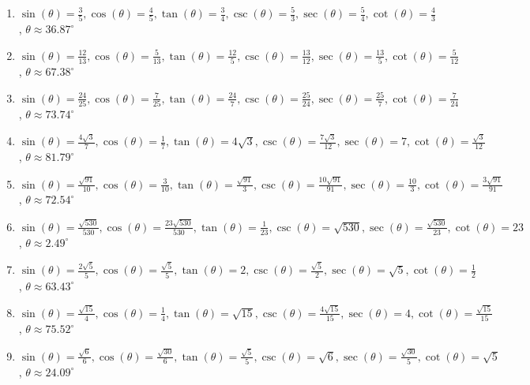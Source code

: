 \documentclass{ximera}
\begin{document}
\begin{enumerate}

\setcounter{enumi}{\value{HW}}

\item $\sin(\theta) = \frac{3}{5}, \cos(\theta) = \frac{4}{5}, \tan(\theta) = \frac{3}{4}, \csc(\theta) = \frac{5}{3}, \sec(\theta) = \frac{5}{4}, \cot(\theta) = \frac{4}{3}$, $\theta \approx 36.87^{\circ}$

\item $\sin(\theta) = \frac{12}{13}, \cos(\theta) = \frac{5}{13}, \tan(\theta) = \frac{12}{5}, \csc(\theta) = \frac{13}{12}, \sec(\theta) = \frac{13}{5}, \cot(\theta) = \frac{5}{12}$, $\theta \approx 67.38^{\circ}$

\item $\sin(\theta) = \frac{24}{25}, \cos(\theta) = \frac{7}{25}, \tan(\theta) = \frac{24}{7}, \csc(\theta) = \frac{25}{24}, \sec(\theta) = \frac{25}{7}, \cot(\theta) = \frac{7}{24}$, $\theta \approx 73.74^{\circ}$

\item $\sin(\theta) = \frac{4\sqrt{3}}{7}, \cos(\theta) = \frac{1}{7}, \tan(\theta) = 4\sqrt{3}, \csc(\theta) = \frac{7\sqrt{3}}{12}, \sec(\theta) = 7, \cot(\theta) = \frac{\sqrt{3}}{12}$,  $\theta \approx 81.79^{\circ}$

\item $\sin(\theta) = \frac{\sqrt{91}}{10}, \cos(\theta) = \frac{3}{10}, \tan(\theta) = \frac{\sqrt{91}}{3}, \csc(\theta) = \frac{10\sqrt{91}}{91}, \sec(\theta) = \frac{10}{3}, \cot(\theta) = \frac{3\sqrt{91}}{91}$, $\theta \approx 72.54^{\circ}$

\item $\sin(\theta) = \frac{\sqrt{530}}{530}, \cos(\theta) = \frac{23\sqrt{530}}{530}, \tan(\theta) = \frac{1}{23}, \csc(\theta) = \sqrt{530}, \sec(\theta) = \frac{\sqrt{530}}{23}, \cot(\theta) = 23$, $\theta \approx 2.49^{\circ}$

\item $\sin(\theta) = \frac{2\sqrt{5}}{5}, \cos(\theta) = \frac{\sqrt{5}}{5}, \tan(\theta) = 2, \csc(\theta) = \frac{\sqrt{5}}{2}, \sec(\theta) = \sqrt{5}, \cot(\theta) = \frac{1}{2}$, $\theta \approx 63.43^{\circ}$

\item  $\sin(\theta) = \frac{\sqrt{15}}{4}, \cos(\theta) = \frac{1}{4}, \tan(\theta) = \sqrt{15}, \csc(\theta) = \frac{4\sqrt{15}}{15}, \sec(\theta) = 4, \cot(\theta) = \frac{\sqrt{15}}{15}$, $\theta \approx 75.52^{\circ}$

\item $\sin(\theta) = \frac{\sqrt{6}}{6}, \cos(\theta) = \frac{\sqrt{30}}{6}, \tan(\theta) = \frac{\sqrt{5}}{5}, \csc(\theta) = \sqrt{6}, \sec(\theta) = \frac{\sqrt{30}}{5}, \cot(\theta) = \sqrt{5}$, $\theta \approx 24.09^{\circ}$


\end{enumerate}
\end{document}
